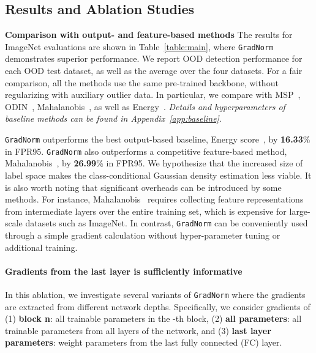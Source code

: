 \documentclass{article}
\begin{document}
\vspace{-0.2cm}
\subsection{Results and Ablation Studies}
\label{sec:ablations}
\vspace{-0.2cm}
\textbf{Comparison with output- and feature-based methods} 
The results for ImageNet evaluations are shown in Table~\ref{table:main}, where \texttt{GradNorm} demonstrates  superior performance. We report OOD detection performance for each OOD test dataset, as well as the average over the four datasets. For a fair comparison, all the methods use the same pre-trained backbone, without regularizing with auxiliary outlier data. 
In particular, we compare with MSP~\cite{hendrycks2016baseline}, ODIN~\cite{liang2018enhancing}, Mahalanobis~\cite{lee2018simple}, as well as Energy~\cite{liu2020energy}.
\emph{Details and hyperparameters of baseline methods can be found in Appendix~\ref{app:baseline}}. 

\texttt{GradNorm} outperforms the best output-based baseline, Energy score~\cite{liu2020energy}, by \textbf{16.33}\% in FPR95. \texttt{GradNorm} also outperforms a competitive feature-based method, Mahalanobis~\cite{lee2018simple}, by \textbf{26.99}\% in FPR95. We hypothesize that the increased size of label space makes the class-conditional Gaussian density estimation less viable. It is also worth noting that significant overheads can be introduced by some methods. 
For instance, Mahalanobis~\cite{lee2018simple} requires collecting feature representations from intermediate layers over the entire training set, which is expensive for large-scale datasets such as ImageNet. 
In contrast, \texttt{GradNorm} can be conveniently used through a simple gradient calculation without hyper-parameter tuning or additional training.
































\paragraph{Gradients from the last layer is sufficiently informative} 
In this ablation, we investigate several variants of \texttt{GradNorm} where the gradients are extracted from different network depths. Specifically, we consider gradients of (1) \textbf{block n}: all trainable parameters in the -th block, (2) \textbf{all parameters}: all trainable parameters from all layers of the network, and (3) \textbf{last layer parameters}: weight parameters from the last fully connected (FC) layer. 
\end{document}
